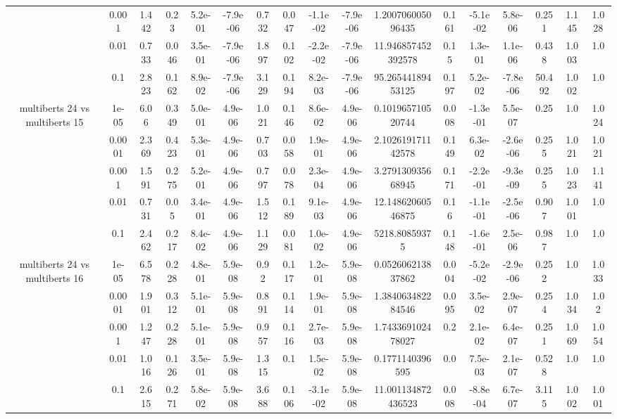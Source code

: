 \begin{tabular}{|c|c|c|c|c|c|c|c|c|c|c|c|c|c|c|c|c|}
 & 0.001 & 1.442 & 0.23 & 5.2e-01 & -7.9e-06 & 0.732 & 0.047 & -1.1e-02 & -7.9e-06 & 1.200706005096435 & 0.161 & -5.1e-02 & 5.8e-06 & 0.251 & 1.145 & 1.028 \\
 & 0.01 & 0.733 & 0.046 & 3.5e-01 & -7.9e-06 & 1.897 & 0.102 & -2.2e-02 & -7.9e-06 & 11.946857452392578 & 0.15 & 1.3e-01 & 1.1e-06 & 0.438 & 1.003 & 1.0 \\
 & 0.1 & 2.823 & 0.162 & 8.9e-02 & -7.9e-06 & 3.129 & 0.194 & 8.2e-03 & -7.9e-06 & 95.26544189453125 & 0.197 & 5.2e-02 & -7.8e-06 & 50.492 & 1.002 & 1.0 \\
\hline
\multirow{5}{*}{multiberts 24 vs multiberts 15} & 1e-05 & 6.06 & 0.349 & 5.0e-01 & 4.9e-06 & 1.021 & 0.146 & 8.6e-02 & 4.9e-06 & 0.101965710520744 & 0.008 & -1.3e-01 & 5.5e-07 & 0.25 & 1.0 & 1.024 \\
 & 0.0001 & 2.369 & 0.423 & 5.3e-01 & 4.9e-06 & 0.703 & 0.058 & 1.9e-01 & 4.9e-06 & 2.102619171142578 & 0.149 & 6.3e-02 & -2.6e-06 & 0.255 & 1.021 & 1.021 \\
 & 0.001 & 1.591 & 0.275 & 5.2e-01 & 4.9e-06 & 0.797 & 0.078 & 2.3e-04 & 4.9e-06 & 3.279130935668945 & 0.171 & -2.2e-01 & -9.3e-09 & 0.255 & 1.023 & 1.141 \\
 & 0.01 & 0.731 & 0.05 & 3.4e-01 & 4.9e-06 & 1.512 & 0.189 & 9.1e-03 & 4.9e-06 & 12.14862060546875 & 0.16 & -1.1e-01 & -2.5e-06 & 0.907 & 1.001 & 1.0 \\
 & 0.1 & 2.462 & 0.217 & 8.4e-02 & 4.9e-06 & 1.129 & 0.081 & 1.0e-02 & 4.9e-06 & 5218.80859375 & 0.148 & -1.6e-01 & 2.5e-06 & 0.987 & 1.0 & 1.0 \\
\hline
\multirow{5}{*}{multiberts 24 vs multiberts 16} & 1e-05 & 6.578 & 0.228 & 4.8e-01 & 5.9e-08 & 0.92 & 0.117 & 1.2e-01 & 5.9e-08 & 0.052606213837862 & 0.004 & -5.2e-02 & -2.9e-06 & 0.252 & 1.0 & 1.033 \\
 & 0.0001 & 1.901 & 0.312 & 5.1e-01 & 5.9e-08 & 0.891 & 0.114 & 1.9e-01 & 5.9e-08 & 1.384063482284546 & 0.095 & 3.5e-02 & 2.9e-07 & 0.254 & 1.034 & 1.02 \\
 & 0.001 & 1.247 & 0.228 & 5.1e-01 & 5.9e-08 & 0.957 & 0.116 & 2.7e-03 & 5.9e-08 & 1.743369102478027 & 0.2 & 2.1e-02 & 6.4e-07 & 0.251 & 1.069 & 1.054 \\
 & 0.01 & 1.016 & 0.126 & 3.5e-01 & 5.9e-08 & 1.315 & 0.1 & 1.5e-02 & 5.9e-08 & 0.1771140396595 & 0.0 & 7.5e-03 & 2.1e-07 & 0.528 & 1.0 & 1.0 \\
 & 0.1 & 2.615 & 0.271 & 5.8e-02 & 5.9e-08 & 3.688 & 0.106 & -3.1e-02 & 5.9e-08 & 11.001134872436523 & 0.008 & -8.8e-04 & 6.7e-07 & 3.115 & 1.002 & 1.001 \\

\end{tabular}
